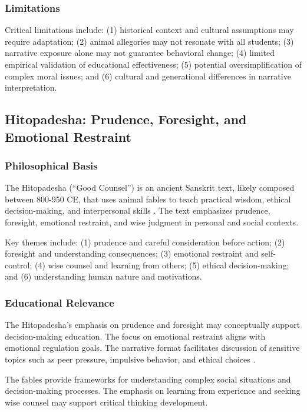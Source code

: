 \documentclass[12pt,a4paper,twocolumn]{article}
\begin{document}
\subsubsection{Limitations}

Critical limitations include: (1) historical context and cultural assumptions may require adaptation; (2) animal allegories may not resonate with all students; (3) narrative exposure alone may not guarantee behavioral change; (4) limited empirical validation of educational effectiveness; (5) potential oversimplification of complex moral issues; and (6) cultural and generational differences in narrative interpretation.

\subsection{Hitopadesha: Prudence, Foresight, and Emotional Restraint}

\subsubsection{Philosophical Basis}

The Hitopadesha (``Good Counsel'') is an ancient Sanskrit text, likely composed between 800-950 CE, that uses animal fables to teach practical wisdom, ethical decision-making, and interpersonal skills \citep{Mukherjee2012}. The text emphasizes prudence, foresight, emotional restraint, and wise judgment in personal and social contexts.

Key themes include: (1) prudence and careful consideration before action; (2) foresight and understanding consequences; (3) emotional restraint and self-control; (4) wise counsel and learning from others; (5) ethical decision-making; and (6) understanding human nature and motivations.

\subsubsection{Educational Relevance}

The Hitopadesha's emphasis on prudence and foresight may conceptually support decision-making education. The focus on emotional restraint aligns with emotional regulation goals. The narrative format facilitates discussion of sensitive topics such as peer pressure, impulsive behavior, and ethical choices \citep{Sharma2017}.

The fables provide frameworks for understanding complex social situations and decision-making processes. The emphasis on learning from experience and seeking wise counsel may support critical thinking development.
\end{document}
